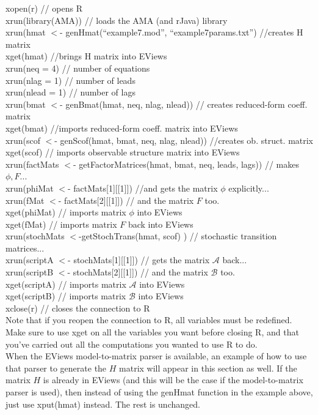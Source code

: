 \documentclass[11pt]{article}
\begin{document}
\indent xopen(r) \quad // opens R \\
\indent xrun(library(AMA)) \quad // loads the AMA (and rJava) library \\
\indent xrun(hmat $<$- genHmat(``example7.mod'', ``example7params.txt'') \quad //creates H matrix \\
\indent xget(hmat) \quad //brings H matrix into EViews \\
\indent xrun(neq = 4) \quad  // number of equations \\
\indent xrun(nlag = 1) \quad // number of leads \\
\indent xrun(nlead = 1) \quad // number of lags \\
\indent xrun(bmat $<$- genBmat(hmat, neq, nlag, nlead)) \quad // creates reduced-form coeff. matrix \\
\indent xget(bmat) \quad //imports reduced-form coeff. matrix into EViews \\
\indent xrun(scof $<$- genScof(hmat, bmat, neq, nlag, nlead)) \quad //creates ob. struct.  matrix \\
\indent xget(scof) \quad // imports observable structure matrix into EViews \\
\indent xrun(factMats $<$- getFactorMatrices(hmat, bmat, neq, leads, lags)) \quad // makes $\phi, F$... \\
\indent xrun(phiMat $<$- factMats[1][[1]]) \quad //and gets the matrix $\phi$ explicitly... \\
\indent xrun(fMat $<$- factMats[2][[1]]) \quad // and the matrix $F$ too. \\
\indent xget(phiMat) \quad // imports matrix $\phi$ into EViews \\
\indent xget(fMat) \quad // imports matrix $F$ back into EViews \\
\indent xrun(stochMats $<$-getStochTrans(hmat, scof) ) \quad // stochastic transition matrices...\\
\indent xrun(scriptA $<$- stochMats[1][[1]]) \quad // gets the matrix $\mathcal{A}$ back... \\
\indent xrun(scriptB $<$- stochMats[2][[1]]) \quad // and the matrix $\mathcal{B}$ too. \\
\indent xget(scriptA) \quad // imports matrix $\mathcal{A}$ into EViews \\
\indent xget(scriptB) \quad // imports matrix $\mathcal{B}$ into EViews \\
\indent xclose(r) \quad // closes the connection to R \\

Note that if you reopen the connection to R, all variables must be redefined.  Make sure to use xget on all the variables you want before closing R, and that you've carried out all the computations you wanted to use R to do. \\

When the EViews model-to-matrix parser is available, an example of how to use that parser to generate the $H$ matrix will appear in this section as well.  If the matrix $H$ is already in EViews (and this will be the case if the model-to-matrix parser is used), then instead of using the genHmat function in the example above, just use xput(hmat) instead.  The rest is unchanged.
\end{document}
